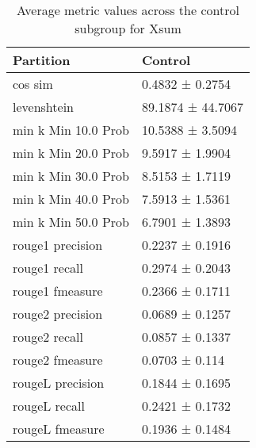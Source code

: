 \begin{table}
\caption{Average metric values across the control subgroup for Xsum}
\label{tab:}
\begin{tabular}{ll}
\toprule
Partition & Control \\
\midrule
cos sim & 0.4832 ± 0.2754 \\
levenshtein & 89.1874 ± 44.7067 \\
min k Min 10.0 Prob & 10.5388 ± 3.5094 \\
min k Min 20.0 Prob & 9.5917 ± 1.9904 \\
min k Min 30.0 Prob & 8.5153 ± 1.7119 \\
min k Min 40.0 Prob & 7.5913 ± 1.5361 \\
min k Min 50.0 Prob & 6.7901 ± 1.3893 \\
rouge1 precision & 0.2237 ± 0.1916 \\
rouge1 recall & 0.2974 ± 0.2043 \\
rouge1 fmeasure & 0.2366 ± 0.1711 \\
rouge2 precision & 0.0689 ± 0.1257 \\
rouge2 recall & 0.0857 ± 0.1337 \\
rouge2 fmeasure & 0.0703 ± 0.114 \\
rougeL precision & 0.1844 ± 0.1695 \\
rougeL recall & 0.2421 ± 0.1732 \\
rougeL fmeasure & 0.1936 ± 0.1484 \\
\bottomrule
\end{tabular}
\end{table}
